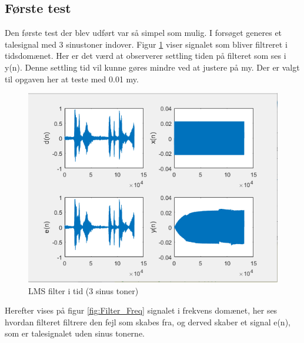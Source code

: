 \subsection{Første test}
Den første test der blev udført var så simpel som mulig. I forsøget generes et talesignal med 3 sinustoner indover. 
Figur \ref{fig:Filter_time} viser signalet som bliver filtreret i tidsdomænet. Her er det værd at observerer settling tiden på filteret som ses i y(n). Denne settling tid vil kunne gøres mindre ved at justere på my. Der er valgt til opgaven her at teste med 0.01 my. 
\begin{figure}[H]
	\centering
	\includegraphics[width = 400pt]{Img/Filter_time}
	\caption{LMS filter i tid (3 sinus toner)}
	\label{fig:Filter_time}
\end{figure}
\newpage
Herefter vises på figur \ref{fig:Filter_Freq} signalet i frekvens domænet, her ses hvordan filteret filtrere den fejl som skabes fra, og derved skaber et signal e(n), som er talesignalet uden sinus tonerne. 


